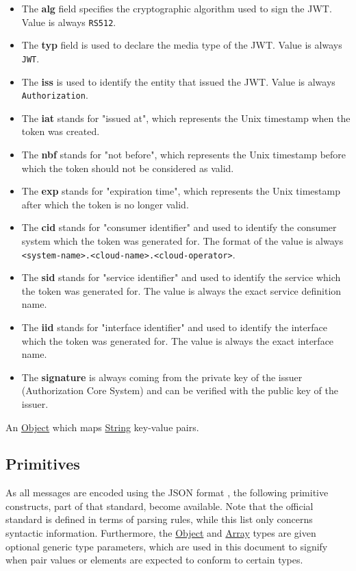 \documentclass[a4paper]{arrowhead}
\newcommand{\pref}[1]{{\textcolor{ArrowheadGrey}{\hyperref[sec:model:primitives:#1]{#1}}}}
\begin{document}
\begin{itemize}
    \item The \textbf{alg} field specifies the cryptographic algorithm used to sign the JWT. Value is always \texttt{RS512}.
    \item The \textbf{typ} field is used to declare the media type of the JWT. Value is always \texttt{JWT}.
    \item The \textbf{iss} is used to identify the entity that issued the JWT. Value is always \texttt{Authorization}.
    \item The \textbf{iat} stands for "issued at", which represents the Unix timestamp when the token was created.
    \item The \textbf{nbf} stands for "not before", which represents the Unix timestamp before which the token should not be considered as valid. 
    \item The \textbf{exp} stands for "expiration time", which represents the Unix timestamp after which the token is no longer valid.
    \item The \textbf{cid} stands for "consumer identifier" and used to identify the consumer system which the token was generated for. The format of the value is always \texttt{<system-name>.<cloud-name>.<cloud-operator>}.
    \item The \textbf{sid} stands for "service identifier" and used to identify the service which the token was generated for. The value is always the exact service definition name.
    \item The \textbf{iid} stands for "interface identifier" and used to identify the interface which the token was generated for. The value is always the exact interface name.
    \item The \textbf{signature} is always coming from the private key of the issuer (Authorization Core System) and can be verified with the public key of the issuer.
\end{itemize}

\label{sec:model:Metadata}

An \pref{Object} which maps \pref{String} key-value pairs.

\newpage

\subsection{Primitives}
\label{sec:model:primitives}

As all messages are encoded using the JSON format \cite{bray2014json}, the following primitive constructs, part of that standard, become available.
Note that the official standard is defined in terms of parsing rules, while this list only concerns syntactic information.
Furthermore, the \pref{Object} and \pref{Array} types are given optional generic type parameters, which are used in this document to signify when pair values or elements are expected to conform to certain types. 
\end{document}
